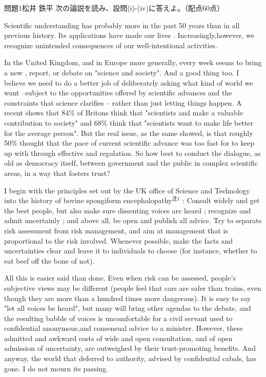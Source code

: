 \documentclass[fleqn]{jbook}
\begin{document}
\begin{question}{問題1}{松井 鉄平}
次の論説を読み、設問(i)-(iv)に答えよ。（配点60点）

	Scientific understanding has probably  more 
in the past 50 years than in all previous history. Its applications have 
made our lives . Increasingly,however, we recognize 
unintended  consequences of our well-intentional activities.

	In the United Kingdom, and in Europe more generally, 
every week seems to bring a new , report, or debate 
on "science and society". And a good thing too. I believe we need 
to do a better job of deliberately asking what kind of world we want 
--subject to the opportunities offered by scientific advances 
and the constraints that science clarifies -- 
rather than just letting things happen. A recent  shows 
that 84\% of Britons think that "scientists and  make 
a valuable contribution to society" and 68\% think that 
"scientists want to make life better for the average 
person". But the real issue, as the same  showed, 
is that roughly 50\% thought that the pace of current scientific advance 
was too fast for  to keep up with through effective 
 and regulation. So how best to conduct the 
dialogue, as old as democracy itself, between government 
 and the public in 
complex scientific areas, in a way that fosters trust?

	I begin with the principles set out by the UK office of Science 
and Technology into the history 
of bovine spongiform encephalopathy$^{注1}$ : Consult widely and get 
the best people, but also make sure dissenting voices are heard 
; recognize and admit uncertainly ; and above all, 
be open and publish all advice. Try to separate risk 
assessment from risk management, and aim at management that is proportional to 
the risk involved. Whenever possible, make the facts and uncertainties 
clear and leave it to individuals to choose 
(for instance, whether to eat beef off the bone of not).

	All this is easier said than done. Even when risk can be assessed,
people's subjective views may be different (people feel that cars are 
safer than trains, even though they are more than a hundred times 
more dangerous). 
It is easy to say "let all voices be heard", but many will 
bring other agendas to the debate, and 
the resulting babble of voices is uncomfortable for a civil servant 
used to confidential anonymous,and consensual advice to a minister. 
However, these admitted and awkward costs 
of wide and open consultation, and of open admission of uncertainty, 
are outweighed by their trust-promoting benefits. And anyway, 
the world that deferred to authority, 
advised by confidential cabals, has gone. I do not mourn its passing.


\end{question}
\end{document}
